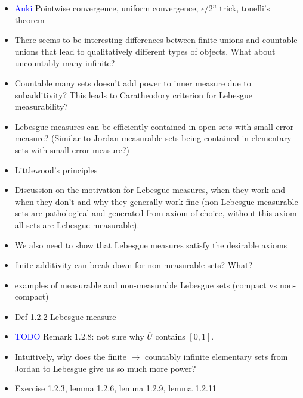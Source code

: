 \documentclass[answers,12pt]{exam}
\begin{document}
\begin{itemize}
    \item \textcolor{blue}{Anki} Pointwise convergence, uniform convergence, $\epsilon/2^n$ trick, tonelli's theorem
    \item There seems to be interesting differences between finite unions and countable unions that lead to qualitatively different types of objects.
    What about uncountably many infinite?
    \item Countable many sets doesn't add power to inner measure due to subadditivity?
    This leads to Caratheodory criterion for Lebesgue measurability?
    \item Lebesgue measures can be efficiently contained in open sets with small error measure? 
    (Similar to Jordan measurable sets being contained in elementary sets with small error measure?)
    \item Littlewood's principles
    \item Discussion on the motivation for Lebesgue measures, when they work and when they don't and why they generally work fine (non-Lebesgue measurable sets are pathological and generated from axiom of choice, without this axiom all sets are Lebesgue measurable).
    \item We also need to show that Lebesgue measures satisfy the desirable axioms 
    \item finite additivity can break down for non-measurable sets? What?
    \item examples of measurable and non-measurable Lebesgue sets (compact vs non-compact)
    \item Def 1.2.2 Lebesgue measure
    \item \textcolor{blue}{TODO} Remark 1.2.8: not sure why $\overline{U}$ contains $[0,1]$.
    \item Intuitively, why does the finite $\rightarrow$ countably infinite elementary sets from Jordan to Lebesgue give us so much more power?
    \item Exercise 1.2.3, lemma 1.2.6, lemma 1.2.9, lemma 1.2.11
\end{itemize}
\end{document}

